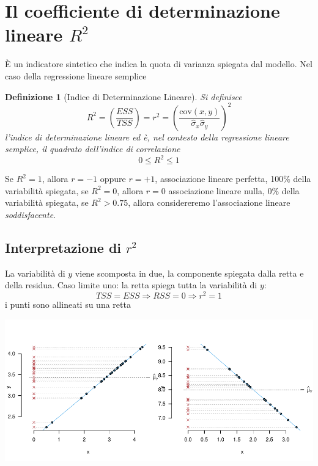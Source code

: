 \documentclass[
  11pt,
]{book}
\theoremstyle{mytheoremstyle}
\theoremstyle{mydefstyle}
\newtheorem{definition}{Definizione}[section]
\begin{document}
\section{\texorpdfstring{Il coefficiente di determinazione lineare \(R^2\)}{Il coefficiente di determinazione lineare R\^{}2}}\label{il-coefficiente-di-determinazione-lineare-r2}

È un indicatore sintetico che indica la quota di varianza spiegata dal modello.
Nel caso della regressione lineare semplice

\begin{info}

\begin{definition}[Indice di Determinazione Lineare]
Si definisce
\[R^2=\left(\frac{ESS}{TSS}\right)=r^2=\left(\frac{\text{cov}(x,y)}{\hat\sigma_x\hat\sigma_y}\right)^2\]
l'indice di determinazione lineare ed è, nel contesto della regressione lineare semplice, il quadrato dell'indice di correlazione
\[0\leq R^2\leq 1\]
\end{definition}

\end{info}

Se \(R^2=1\), allora \(r=-1\) oppure \(r=+1\), associazione lineare perfetta, 100\% della variabilità spiegata, se \(R^2=0\), allora \(r=0\) associazione lineare nulla, 0\% della variabilità spiegata, se \(R^2>0.75\), allora considereremo l'associazione lineare \emph{soddisfacente}.

\subsection{\texorpdfstring{Interpretazione di \(r^2\)}{Interpretazione di r\^{}2}}\label{interpretazione-di-r2}

La variabilità di \(y\) viene scomposta in due, la componente spiegata dalla retta e della residua.
Caso limite uno: la retta spiega tutta la variabilità di \(y\):
\[TSS = ESS\Rightarrow RSS=0\Rightarrow r^2=1\]
i punti sono allineati su una retta

\begin{center}\includegraphics{Appunti_di_Statistica_2025_files/figure-latex/17-regressione-I-56-1} \end{center}
\end{document}
